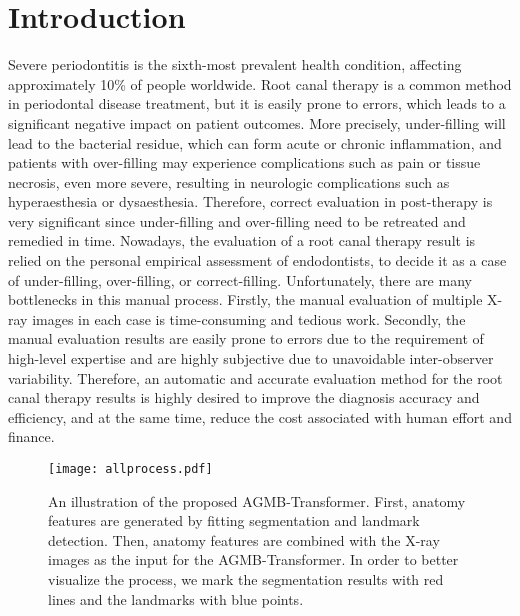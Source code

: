 \documentclass[journal]{IEEEtran}
\begin{document}
\section{Introduction}
Severe periodontitis is the sixth-most prevalent health condition, affecting approximately 10\% of people worldwide\cite{peres2019oral}. Root canal therapy is a common method in periodontal disease treatment, but it is easily prone to errors\cite{meirinhos2020prevalence,boucher2002radiographic,lazarski2001epidemiological,kaplan2019dental}, which leads to a significant negative impact on patient outcomes\cite{lin2005procedural,estrela2014characterization,saunders1997technical,petersen2005global}. More precisely, under-filling will lead to the bacterial residue, which can form acute or chronic inflammation, and patients with over-filling may experience complications such as pain or tissue necrosis, even more severe, resulting in neurologic complications such as hyperaesthesia or dysaesthesia\cite{kim2016accidental}. Therefore, correct evaluation in post-therapy is very significant since under-filling and over-filling need to be retreated and remedied in time. Nowadays, the evaluation of a root canal therapy result is relied on the personal empirical assessment of endodontists, to decide it as a case of under-filling, over-filling, or correct-filling\cite{field2004clinical}. Unfortunately, there are many bottlenecks in this manual process. Firstly, the manual evaluation of multiple X-ray images in each case is time-consuming and tedious work. Secondly, the manual evaluation results are easily prone to errors due to the requirement of high-level expertise and are highly subjective due to unavoidable inter-observer variability. Therefore, an automatic and accurate evaluation method for the root canal therapy results is highly desired to improve the diagnosis accuracy and efficiency, and at the same time, reduce the cost associated with human effort and finance. 




\begin{figure*}[ht]
  \centering
  \texttt{[image: allprocess.pdf]}
  \caption{An illustration of the proposed AGMB-Transformer. First, anatomy features are generated by fitting segmentation and landmark detection. Then, anatomy features are combined with the X-ray images as the input for the AGMB-Transformer. In order to better visualize the process, we mark the segmentation results with red lines and the landmarks with blue points. }
  \label{fig:allprocess}
\end{figure*}
\end{document}
